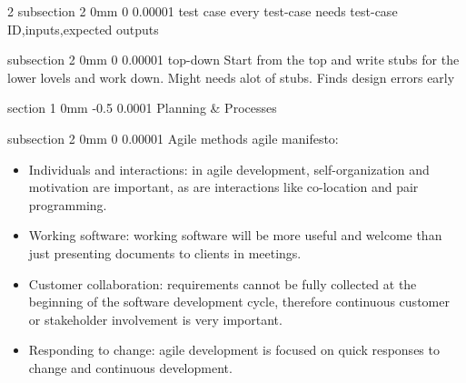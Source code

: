 \documentclass[a4paper,11pt]{article}
\makeatletter
\renewcommand{\section}{\@startsection
   {section}%
   {1}%
   {0mm}%
   {-0.5\baselineskip}%
   {0.0001\baselineskip}%
   {\sffamily\bfseries\upshape\normalsize}}%
\renewcommand{\subsection}{\@startsection
   {subsection}%
   {2}%
   {0mm}%
   {0\baselineskip}%
   {0.00001\baselineskip}%
   {\rmfamily\normalfont\slshape\normalsize}}%
\makeatother
\begin{document}
\begin{multicols}{2}
\subsection{test case}
every test-case needs test-case ID,inputs,expected outputs

\subsection{top-down}
Start from the top and write stubs for the lower lovels and work down. Might needs alot of stubs. Finds design errors early

\section{Planning \& Processes}

\subsection{Agile methods}
agile manifesto:
\vspace{0 mm}
\begin{itemize}
 \setlength\itemsep{0em}
\item Individuals and interactions: in agile development, self-organization and motivation are important, as are interactions like co-location and pair programming.
\item Working software: working software will be more useful and welcome than just presenting documents to clients in meetings.
\item Customer collaboration: requirements cannot be fully collected at the beginning of the software development cycle, therefore continuous customer or stakeholder involvement is very important.
\item Responding to change: agile development is focused on quick responses to change and continuous development.


\end{itemize}
\end{multicols}
\end{document}
